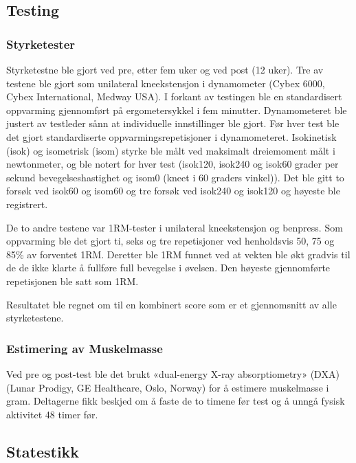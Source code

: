 \documentclass[
]{book}
\begin{document}
\hypertarget{testing}{%
\subsection{Testing}\label{testing}}

\hypertarget{styrketester}{%
\subsubsection{Styrketester}\label{styrketester}}

Styrketestne ble gjort ved pre, etter fem uker og ved post (12 uker). Tre av testene ble gjort som unilateral kneekstensjon i dynamometer (Cybex 6000, Cybex International, Medway USA). I forkant av testingen ble en standardisert oppvarming gjennomført på ergometersykkel i fem minutter. Dynamometeret ble justert av testleder sånn at individuelle innstillinger ble gjort. Før hver test ble det gjort standardiserte oppvarmingsrepetisjoner i dynamometeret. Isokinetisk (isok) og isometrisk (isom) styrke ble målt ved maksimalt dreiemoment målt i newtonmeter, og ble notert for hver test (isok120, isok240 og isok60 grader per sekund bevegelseshastighet og isom0 (kneet i 60 graders vinkel)). Det ble gitt to forsøk ved isok60 og isom60 og tre forsøk ved isok240 og isok120 og høyeste ble registrert.

De to andre testene var 1RM-tester i unilateral kneekstensjon og benpress. Som oppvarming ble det gjort ti, seks og tre repetisjoner ved henholdsvis 50, 75 og 85\% av forventet 1RM. Deretter ble 1RM funnet ved at vekten ble økt gradvis til de de ikke klarte å fullføre full bevegelse i øvelsen. Den høyeste gjennomførte repetisjonen ble satt som 1RM.

Resultatet ble regnet om til en kombinert score som er et gjennomsnitt av alle styrketestene.

\hypertarget{estimering-av-muskelmasse}{%
\subsubsection{Estimering av Muskelmasse}\label{estimering-av-muskelmasse}}

Ved pre og post-test ble det brukt «dual-energy X-ray absorptiometry» (DXA)(Lunar Prodigy, GE Healthcare, Oslo, Norway) for å estimere muskelmasse i gram. Deltagerne fikk beskjed om å faste de to timene før test og å unngå fysisk aktivitet 48 timer før.

\hypertarget{statestikk}{%
\subsection{Statestikk}\label{statestikk}}
\end{document}
